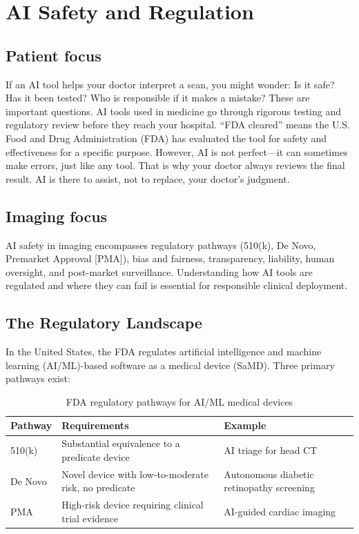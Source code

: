 \chapter{AI Safety and Regulation}
\label{ch:ch89_ai_safety}

\section*{Patient focus}
If an AI tool helps your doctor interpret a scan, you might wonder: Is it safe? Has it been tested? Who is responsible if it makes a mistake? These are important questions. AI tools used in medicine go through rigorous testing and regulatory review before they reach your hospital. ``FDA cleared'' means the U.S. Food and Drug Administration (FDA) has evaluated the tool for safety and effectiveness for a specific purpose. However, AI is not perfect---it can sometimes make errors, just like any tool. That is why your doctor always reviews the final result. AI is there to assist, not to replace, your doctor's judgment.

\section*{Imaging focus}
AI safety in imaging encompasses regulatory pathways (510(k), De Novo, Premarket Approval [PMA]), bias and fairness, transparency, liability, human oversight, and post-market surveillance. Understanding how AI tools are regulated and where they can fail is essential for responsible clinical deployment.

\section{The Regulatory Landscape}
In the United States, the FDA regulates artificial intelligence and machine learning (AI/ML)-based software as a medical device (SaMD). Three primary pathways exist:

\begin{table}[ht]
\centering
\caption{FDA regulatory pathways for AI/ML medical devices}
\label{tab:fda_ai_pathways}
\begin{tabular}{@{}p{}p{}p{}@{}}
\toprule
\textbf{Pathway} & \textbf{Requirements} & \textbf{Example} \\
\midrule
510(k) & Substantial equivalence to a predicate device & AI triage for head CT \\
De Novo & Novel device with low-to-moderate risk, no predicate & Autonomous diabetic retinopathy screening \\
PMA & High-risk device requiring clinical trial evidence & AI-guided cardiac imaging \\
\bottomrule
\end{tabular}
\end{table}

